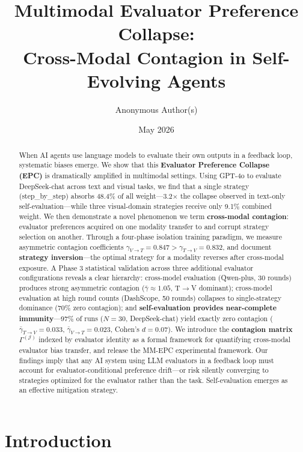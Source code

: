 \documentclass[11pt,a4paper]{article}
\title{\Large\textbf{Multimodal Evaluator Preference Collapse: \\Cross-Modal Contagion in Self-Evolving Agents}}
\author{Anonymous Author(s)}
\date{May 2026}
\begin{document}
\maketitle

\begin{abstract}
When AI agents use language models to evaluate their own outputs in a feedback loop, systematic biases emerge. We show that this \textbf{Evaluator Preference Collapse (EPC)} is dramatically amplified in multimodal settings. Using GPT-4o to evaluate DeepSeek-chat across text and visual tasks, we find that a single strategy (step\_by\_step) absorbs 48.4\% of all weight---3.2$\times$ the collapse observed in text-only self-evaluation---while three visual-domain strategies receive only 9.1\% combined weight. We then demonstrate a novel phenomenon we term \textbf{cross-modal contagion}: evaluator preferences acquired on one modality transfer to and corrupt strategy selection on another. Through a four-phase isolation training paradigm, we measure asymmetric contagion coefficients $\gamma_{V\to T}=0.847 > \gamma_{T\to V}=0.832$, and document \textbf{strategy inversion}---the optimal strategy for a modality reverses after cross-modal exposure. A Phase 3 statistical validation across three additional evaluator configurations reveals a clear hierarchy: cross-model evaluation (Qwen-plus, 30 rounds) produces strong asymmetric contagion ($\bar{\gamma} \approx 1.05$, T$\to$V dominant); cross-model evaluation at high round counts (DashScope, 50 rounds) collapses to single-strategy dominance (70\% zero contagion); and \textbf{self-evaluation provides near-complete immunity}---97\% of runs ($N=30$, DeepSeek-chat) yield exactly zero contagion ($\bar{\gamma}_{T\to V}=0.033$, $\bar{\gamma}_{V\to T}=0.023$, Cohen's $d=0.07$). We introduce the \textbf{contagion matrix $\Gamma^{(\mathcal{J})}$} indexed by evaluator identity as a formal framework for quantifying cross-modal evaluator bias transfer, and release the MM-EPC experimental framework. Our findings imply that any AI system using LLM evaluators in a feedback loop must account for evaluator-conditional preference drift---or risk silently converging to strategies optimized for the evaluator rather than the task. Self-evaluation emerges as an effective mitigation strategy.
\end{abstract}

\section{Introduction}
\end{document}
